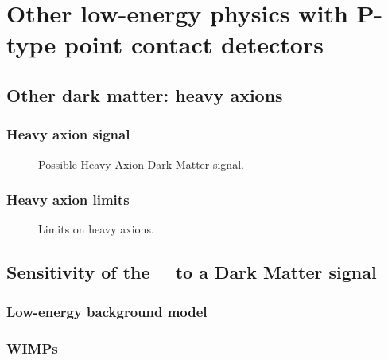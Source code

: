 \chapter{Other low-energy physics with P-type point contact detectors}

		
	\section{Other dark matter: heavy axions}
	\label{sec:CalcLimitsOnHeavyAxions}		
		


	\subsection{Heavy axion signal}
	\label{sec:CalcLimitsOnHeavyAxionSignal}		

		\begin{figure}
			\centering
			\caption{Possible Heavy Axion Dark Matter signal.}
			\label{fig:HeavyAxionSignal}
		\end{figure}

	\subsection{Heavy axion limits}
	\label{sec:CalcLimitsOnHeavyAxionLimits}		
				
		\begin{figure}
			\centering
			\caption{Limits on heavy axions.}
			\label{fig:HeavyAxionLimits}
		\end{figure}
		
							
	\section{Sensitivity of the \MJ~\minmod~to a Dark Matter signal}
	\label{sec:MJSensitivity}
	
		\subsection{Low-energy background model}
		\label{sec:MJLowEnergyBackgroundModel}
		
		\subsection{WIMPs}
		\label{sec:MJSensitivityToWIMP}
		
